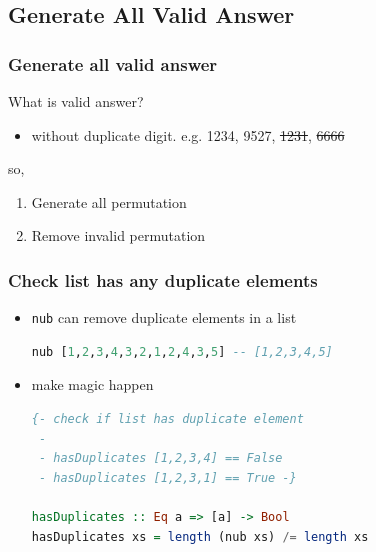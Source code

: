 \documentclass[10pt]{beamer}
\begin{document}
\subsection{Generate All Valid Answer}

\begin{frame}
\frametitle{Generate all valid answer}

What is valid answer?
\begin{itemize}
    \item without duplicate digit. e.g. 1234, 9527, \sout{1231}, \sout{6666}
\end{itemize}

\pause
so,
\begin{enumerate}
    \item Generate all permutation
    \item Remove invalid permutation
\end{enumerate}
    
\end{frame}




\begin{frame}[fragile]
\frametitle{Check list has any duplicate elements}

\begin{itemize}[<+->]
    \item \texttt{nub} can remove duplicate elements in a list\\ \begin{lstlisting}[language=Haskell,numbers=none]
nub [1,2,3,4,3,2,1,2,4,3,5] -- [1,2,3,4,5]
\end{lstlisting}

    \item make magic happen%
\begin{lstlisting}[language=Haskell]
{- check if list has duplicate element
 -
 - hasDuplicates [1,2,3,4] == False
 - hasDuplicates [1,2,3,1] == True -}
 
hasDuplicates :: Eq a => [a] -> Bool
hasDuplicates xs = length (nub xs) /= length xs
\end{lstlisting}
\end{itemize}
    
\end{frame}
\end{document}
